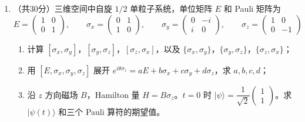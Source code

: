 \begin{enumerate}
{\begin{enumerate}
		矩阵元为
		\begin{align*}
			\langle f|x|i\rangle=\sqrt{\frac{\hbar}{2m\omega_0}}\langle n_x',n_y',n_z'|(a_x+a_x^{\dagger})|n_x,n_y,n_z\rangle
		\end{align*}
		由于 $a_x|n_x\rangle=\sqrt{n_x}|n_x-1\rangle$，$a_x^{\dagger}|n_x\rangle=\sqrt{n_x+1}|n_x+1\rangle$，且 $y,z$ 方向需正交守恒，矩阵元非零的条件为
		\begin{align*}
			\Delta n_x=n_x'-n_x=\pm1,\qquad \Delta n_y=0,\qquad \Delta n_z=0
		\end{align*}
		此即选择定则。再由含时微扰论，$\cos(\omega t)=\dfrac{1}{2}(e^{i\omega t}+e^{-i\omega t})$ 在长时间极限下给出能量守恒：
		\begin{align*}
			E_f-E_i=\pm\hbar\omega
		\end{align*}
		其中 $E_f-E_i=+\hbar\omega$ 对应吸收（$\Delta n_x=+1$），$E_f-E_i=-\hbar\omega$ 对应受激发射（$\Delta n_x=-1$）。由于能级间隔固定为 $\hbar\omega_0$，共振条件即 $\omega=\omega_0$。
	\end{enumerate}
	}

	\item
	（共30分）三维空间中自旋 $1/2$ 单粒子系统，单位矩阵 $E$ 和 Pauli 矩阵为
	\[
	E=\begin{pmatrix}1&0\\0&1\end{pmatrix},\qquad
	\sigma_x=\begin{pmatrix}0&1\\1&0\end{pmatrix},\qquad
	\sigma_y=\begin{pmatrix}0&-i\\i&0\end{pmatrix},\qquad
	\sigma_z=\begin{pmatrix}1&0\\0&-1\end{pmatrix}
	\]
	\begin{enumerate}
		\item 计算 $[\sigma_x,\sigma_y]$，$[\sigma_y,\sigma_z]$，$[\sigma_z,\sigma_x]$，以及 $\{\sigma_x,\sigma_y\}$，$\{\sigma_y,\sigma_z\}$，$\{\sigma_z,\sigma_x\}$；
		\item 用 $[E,\sigma_x,\sigma_y,\sigma_z]$ 展开 $e^{i\theta\sigma_z}=aE+b\sigma_x+c\sigma_y+d\sigma_z$，求 $a,b,c,d$；
		\item 沿 $z$ 方向磁场 $B$，Hamilton 量 $H=B\sigma_z$。$t=0$ 时 $|\psi\rangle=\dfrac{1}{\sqrt{2}}\begin{pmatrix}1\\1\end{pmatrix}$。求 $|\psi(t)\rangle$ 和三个 Pauli 算符的期望值。
	\end{enumerate}


\end{enumerate}
